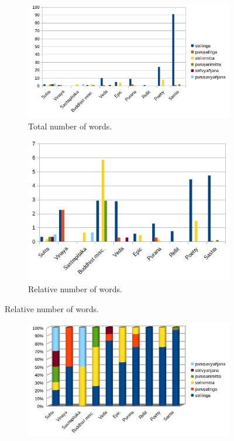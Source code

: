 \begin{figure}[!h]
  \begin{subfigure}{0.551\linewidth}
    \includegraphics[width=\linewidth]{stri.jpg}
    \caption{Total number of words.}
  \end{subfigure}
  \hfill
  \begin{subfigure}{0.449\linewidth}
    \includegraphics[width=\linewidth]{stri_weighted.jpg}
    \caption{Relative number of words.}
  \end{subfigure}
\setcounter{figure}{13}
\label{stri}
\end{figure}

\begin{figure}[!h]
  \begin{subfigure}{\linewidth}
  \begin{center}
    \includegraphics[width=0.5\linewidth]{stri_perc.jpg}
  \end{center}
  \end{subfigure}
\setcounter{figure}{14}
\label{stri2}
\end{figure}

